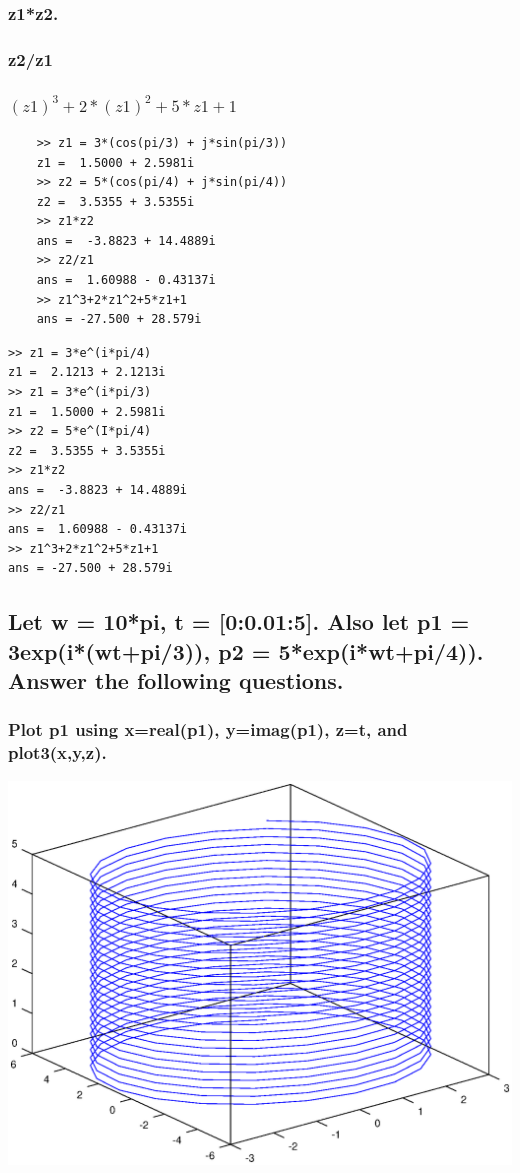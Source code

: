 \documentclass[12pt,a4paper]{article}
\begin{document}
\subsubsection{z1*z2.} 
\subsubsection{z2/z1}
\subsubsection{$(z1)^3+2*(z1)^2+5*z1+1$}
\begin{lstlisting}
	>> z1 = 3*(cos(pi/3) + j*sin(pi/3))
	z1 =  1.5000 + 2.5981i
	>> z2 = 5*(cos(pi/4) + j*sin(pi/4))
	z2 =  3.5355 + 3.5355i
	>> z1*z2
	ans =  -3.8823 + 14.4889i
	>> z2/z1
	ans =  1.60988 - 0.43137i
	>> z1^3+2*z1^2+5*z1+1
	ans = -27.500 + 28.579i
\end{lstlisting}
\begin{lstlisting}
>> z1 = 3*e^(i*pi/4)
z1 =  2.1213 + 2.1213i
>> z1 = 3*e^(i*pi/3)
z1 =  1.5000 + 2.5981i
>> z2 = 5*e^(I*pi/4)
z2 =  3.5355 + 3.5355i
>> z1*z2
ans =  -3.8823 + 14.4889i
>> z2/z1
ans =  1.60988 - 0.43137i
>> z1^3+2*z1^2+5*z1+1
ans = -27.500 + 28.579i
\end{lstlisting}

\subsection{Let w = 10*pi, t = [0:0.01:5].  Also let p1 = 3exp(i*(wt+pi/3)), p2 = 5*exp(i*wt+pi/4)).  Answer the following questions.} 
\subsubsection{Plot p1 using x=real(p1), y=imag(p1), z=t, and plot3(x,y,z).} 
\includegraphics[width=\textwidth]{3a.eps}
\end{document}

